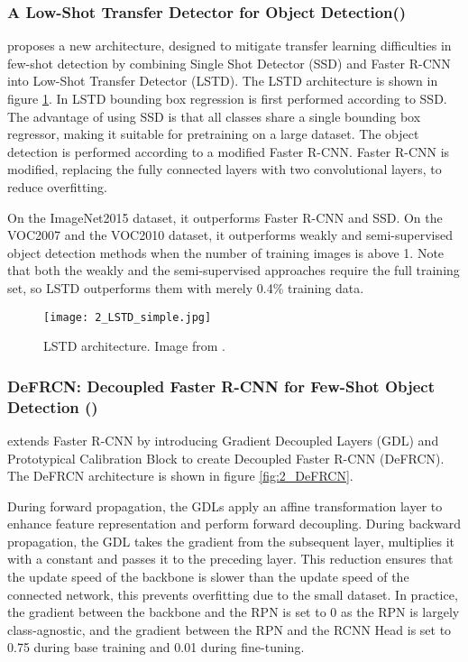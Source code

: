 \subsubsection{A Low-Shot Transfer Detector for Object Detection(\citet{LSTD})}
\citet{LSTD} proposes a new architecture, designed to mitigate transfer learning difficulties in few-shot detection by combining Single Shot Detector (SSD) and Faster R-CNN into Low-Shot Transfer Detector (LSTD). The LSTD architecture is shown in figure \ref{fig:2_LSTD}. In LSTD bounding box regression is first performed according to SSD. The advantage of using SSD is that all classes share a single bounding box regressor, making it suitable for pretraining on a large dataset. The object detection is performed according to a modified Faster R-CNN. Faster R-CNN is modified, replacing the fully connected layers with two convolutional layers, to reduce overfitting.

On the ImageNet2015 dataset, it outperforms Faster R-CNN and SSD. On the VOC2007 and the VOC2010 dataset, it outperforms weakly and semi-supervised object detection methods when the number of training images is above 1. Note that both the weakly and the semi-supervised approaches require the full training set, so LSTD outperforms them with merely 0.4\% training data.

\begin{figure}[h]
	\centering
	\texttt{[image: 2\_LSTD\_simple.jpg]}
	\caption{\label{fig:2_LSTD} LSTD architecture. Image from \citet{LSTD}.}
\end{figure}

\subsubsection{DeFRCN: Decoupled Faster R-CNN for Few-Shot Object Detection (\citet{DeFRCN})}
\citet{DeFRCN} extends Faster R-CNN\cite{fasterrcnn} by introducing Gradient Decoupled Layers (GDL) and Prototypical Calibration Block to create Decoupled Faster R-CNN (DeFRCN). The DeFRCN architecture is shown in figure \ref{fig:2_DeFRCN}.

During forward propagation, the GDLs apply an affine transformation layer to enhance feature representation and perform forward decoupling. During backward propagation, the GDL takes the gradient from the subsequent layer, multiplies it with a constant and passes it to the preceding layer. This reduction ensures that the update speed of the backbone is slower than the update speed of the connected network, this prevents overfitting due to the small dataset. In practice, the gradient between the backbone and the RPN is set to 0 as the RPN is largely class-agnostic, and the gradient between the RPN and the RCNN Head is set to 0.75 during base training and 0.01 during fine-tuning.

